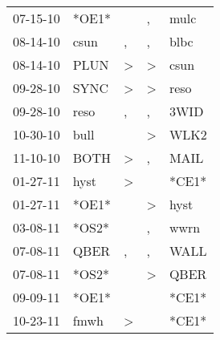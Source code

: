 \begin{supertabular}{p{0.07\textwidth}p{0.06\textwidth}p{0.02\textwidth}p{0.02\textwidth}p{0.06\textwidth}}
          07-15-10\textsuperscript{} &                            *OE1* &                  &                , &           mulc\textsuperscript{} \\
          08-14-10\textsuperscript{} &           csun\textsuperscript{} &                , &                , &           blbc\textsuperscript{} \\
          08-14-10\textsuperscript{} &           PLUN\textsuperscript{} &     \textgreater &     \textgreater &           csun\textsuperscript{} \\
          09-28-10\textsuperscript{} &           SYNC\textsuperscript{} &     \textgreater &     \textgreater &           reso\textsuperscript{} \\
          09-28-10\textsuperscript{} &           reso\textsuperscript{} &                , &                , &           3WID\textsuperscript{} \\
          10-30-10\textsuperscript{} &           bull\textsuperscript{} &                  &     \textgreater &           WLK2\textsuperscript{} \\
          11-10-10\textsuperscript{} &           BOTH\textsuperscript{} &     \textgreater &                , &           MAIL\textsuperscript{} \\
          01-27-11\textsuperscript{} &           hyst\textsuperscript{} &     \textgreater &                  &                            *CE1* \\
          01-27-11\textsuperscript{} &                            *OE1* &                  &     \textgreater &           hyst\textsuperscript{} \\
          03-08-11\textsuperscript{} &                            *OS2* &                  &                , &           wwrn\textsuperscript{} \\
          07-08-11\textsuperscript{} &           QBER\textsuperscript{} &                , &                , &           WALL\textsuperscript{} \\
          07-08-11\textsuperscript{} &                            *OS2* &                  &     \textgreater &           QBER\textsuperscript{} \\
          09-09-11\textsuperscript{} &                            *OE1* &                  &                  &                            *CE1* \\
          10-23-11\textsuperscript{} &           fmwh\textsuperscript{} &     \textgreater &                  &                            *CE1* \\

\end{supertabular}
